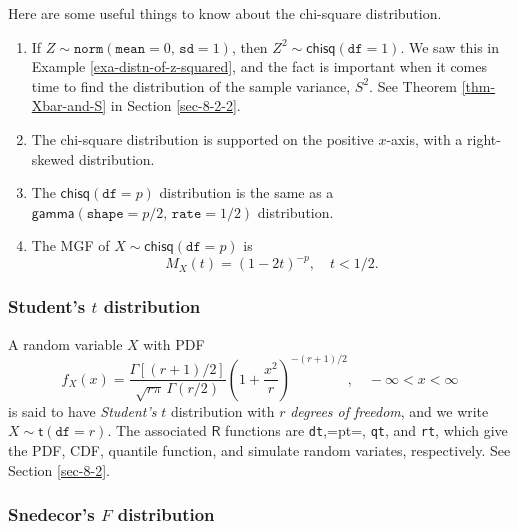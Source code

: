 \documentclass[captions=tableheading]{scrbook}
\begin{document}
\begin{rem}
Here are some useful things to know about the chi-square distribution.
\begin{enumerate}
\item If \(Z\sim\mathtt{norm}(\mathtt{mean}=0,\,\mathtt{sd}=1)\), then \(Z^{2}\sim\mathsf{chisq}(\mathtt{df}=1)\). We saw this in Example \ref{exa-distn-of-z-squared}, and the fact is important when it comes time to find the distribution of the sample variance, \(S^{2}\). See Theorem \ref{thm-Xbar-and-S} in Section \ref{sec-8-2-2}.
\item The chi-square distribution is supported on the positive \(x\)-axis, with a right-skewed distribution.
\item The \(\mathsf{chisq}(\mathtt{df}=p)\) distribution is the same as a \(\mathsf{gamma}(\mathtt{shape}=p/2,\,\mathtt{rate}=1/2)\) distribution.
\item The MGF of \(X\sim\mathsf{chisq}(\mathtt{df}=p)\) is
   \begin{equation}
   M_{X}(t)=\left(1-2t\right)^{-p},\quad t<1/2.\label{eq-mgf-chisq}
   \end{equation}
\end{enumerate}

\end{rem}
\subsubsection{Student's \(t\) distribution}
\label{sec-6-5-2-2}
\label{sub-Student's-t-distribution}


A random variable \(X\) with PDF
\begin{equation}
f_{X}(x)=\frac{\Gamma\left[(r+1)/2\right]}{\sqrt{r\pi}\,\Gamma(r/2)}\left(1+\frac{x^{2}}{r}\right)^{-(r+1)/2},\quad-\infty<x<\infty
\end{equation}
is said to have \emph{Student's} \(t\) distribution with \(r\) \emph{degrees of freedom}, and we write \(X\sim\mathsf{t}(\mathtt{df}=r)\). The associated \(\mathsf{R}\) functions are \texttt{dt},=pt=, \texttt{qt}, and \texttt{rt}, which give the PDF, CDF, quantile function, and simulate random variates, respectively. See Section \ref{sec-8-2}.
\subsubsection{Snedecor's \(F\) distribution}
\label{sec-6-5-2-3}
\label{sub-snedecor-F-distribution}
\end{document}
